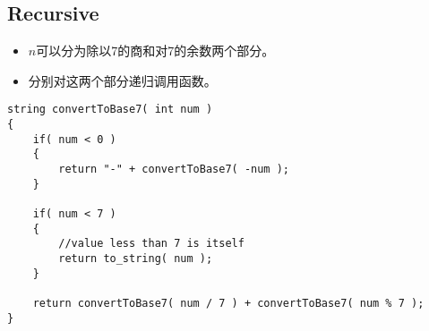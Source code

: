 \subsection{Recursive}
\begin{itemize}
\item $n$可以分为除以7的商和对7的余数两个部分。
\item 分别对这两个部分递归调用函数。
\end{itemize}

\begin{lstlisting}[style=customc, caption={Recursion}]
string convertToBase7( int num )
{
    if( num < 0 )
    {
        return "-" + convertToBase7( -num );
    }

    if( num < 7 )
    {
        //value less than 7 is itself
        return to_string( num );
    }

    return convertToBase7( num / 7 ) + convertToBase7( num % 7 );
}
\end{lstlisting}